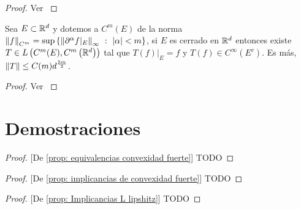 \begin{proof}
	Ver \cite{dougherty:1989}
\end{proof}

\begin{theorem}
	\label{theorem: Extension de Whitney mejorado}
	Sea $E \subset {\mathbb{R}}^d$ y dotemos a $C^m(E)$ de la norma $\left\lVert f\right\rVert_{C^m} = \sup\left\lbrace\left\lVert\partial^{\alpha}f\vert_E \right\rVert_{\infty} ~:~ \left\lvert\alpha\right\rvert < m\right\rbrace$, si $E$ es cerrado en ${\mathbb{R}}^d$ entonces existe $T \in L\left(C^m(E), C^m\left({\mathbb{R}}^d \right) \right)$ tal que $T(f) \vert_E = f$ y $T(f) \in C^{\infty}(E^c)$. Es m\'as, $\left\lVert T\right\rVert \leq C(m) d^{\frac{5m}{2}}$.
\end{theorem}

\begin{proof}
	Ver \cite{cheng:2015}
\end{proof}

\section{Demostraciones}

\begin{proof}{[De \ref{prop: equivalencias convexidad fuerte}]}
	\color{Red} TODO
\end{proof}

\begin{proof}{[De \ref{prop: implicancias de convexidad fuerte}]}
	\color{Red} TODO
\end{proof}

\begin{proof}{[De \ref{prop: Implicancias L lipshitz}]}
	\color{Red} TODO
\end{proof}

